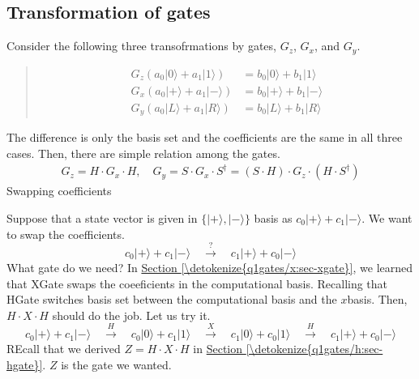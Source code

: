 \documentclass[letterpaper,10pt,english]{jupyterBook}
\begin{document}
\subsection{Transformation of gates}
\label{\detokenize{q1gates/change-basis:transformation-of-gates}}
\sphinxAtStartPar
Consider the following three transofrmations by gates, \(G_z\), \(G_x\), and \(G_y\).
\begin{quote}
\begin{align}
G_z \left (a_0 |0\rangle + a_1 |1\rangle\right) &= b_0 |0\rangle + b_1 |1\rangle \\
G_x \left (a_0 |+\rangle + a_1 |-\rangle\right) &= b_0 |+\rangle + b_1 |-\rangle\\
G_y \left (a_0 |L\rangle + a_1 |R\rangle\right) &= b_0 |L\rangle + b_1 |R\rangle
\end{align}
\end{quote}

\sphinxAtStartPar
The difference is only the basis set and the coefficients are the same in all three cases.  Then, there are simple relation among the gates.
\begin{equation*}
\begin{split}
G_z = H \cdot G_x \cdot H, \quad G_y = S \cdot G_x \cdot S^\dagger = (S \cdot H) \cdot G_z  \cdot(H \cdot S^\dagger)
\end{split}
\end{equation*}
\sphinxAtStartPar
{}  Swapping coefficients

\sphinxAtStartPar
Suppose that a state vector is given in \(\{|+\rangle,|-\rangle\}\) basis as \(c_0 |+\rangle + c_1 |-\rangle\). We want to swap the coefficients.
\begin{equation*}
c_0 |+\rangle + c_1 |-\rangle \quad \xrightarrow{?} \quad c_1 |+\rangle + c_0 |-\rangle
\end{equation*}
\sphinxAtStartPar
What gate do we need?  In \hyperref[\detokenize{q1gates/x:sec-xgate}]{Section \ref{\detokenize{q1gates/x:sec-xgate}}}, we learned that XGate swaps the coeeficients in the computational basis. Recalling that HGate switches basis set between the computational basis and the \(x\)\sphinxhyphen{}basis.  Then, \(H \cdot X \cdot H\) should do the job.  Let us try it.
\begin{equation*}
c_0 |+\rangle + c_1 |-\rangle \quad \xrightarrow{H} \quad c_0 |0\rangle + c_1 |1\rangle
\quad \xrightarrow{X} \quad  c_1 |0\rangle + c_0 |1\rangle \quad \xrightarrow{H} \quad
c_1 |+\rangle + c_0 |-\rangle
\end{equation*}
\sphinxAtStartPar
REcall that  we derived \(Z=H \cdot X \cdot H\) in \hyperref[\detokenize{q1gates/h:sec-hgate}]{Section \ref{\detokenize{q1gates/h:sec-hgate}}}.  \(Z\) is the gate we wanted.
\end{document}
